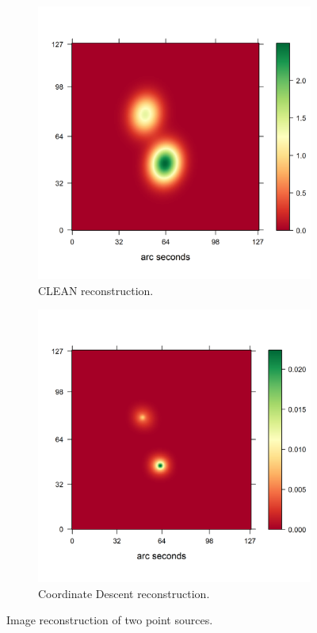 \begin{figure}[h]
	\centering
	\begin{subfigure}[b]{0.4\linewidth}
		\includegraphics[width=\linewidth, trim={0.2in, 0.2in, 0, 0.2in}, clip]{./chapters/20.results/points/tclean_points.png}
		\caption{CLEAN reconstruction.}
		\label{results:points:tclean}
	\end{subfigure}
	\begin{subfigure}[b]{0.4\linewidth}
		\includegraphics[width=\linewidth, trim={0.2in, 0.2in, 0, 0.2in}, clip]{./chapters/20.results/points/cd_points.png}
		\caption{Coordinate Descent reconstruction.}
		\label{results:points:cd}
	\end{subfigure}
	
	\caption{Image reconstruction of two point sources.}
	\label{results:point}
\end{figure}

